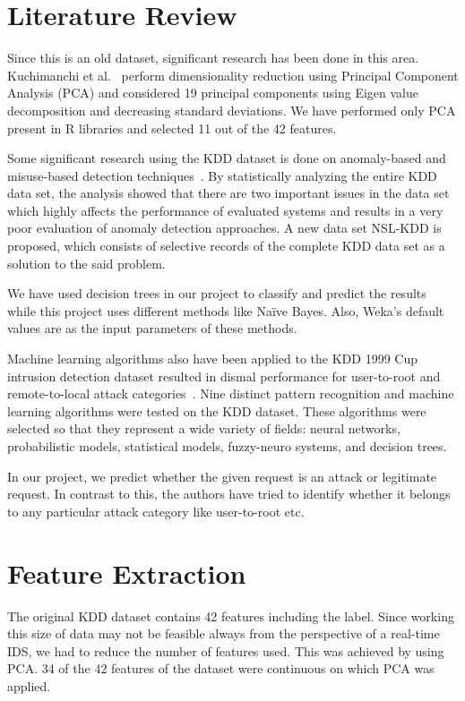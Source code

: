 \documentclass[11pt]{article}
\begin{document}
\section{Literature Review}
\label{Sec:Lit}
Since this is an old dataset, significant research has been done in this area. Kuchimanchi et al.~\cite{DimRed} perform dimensionality reduction using Principal Component Analysis (PCA) and considered 19 principal components using Eigen value decomposition and decreasing standard deviations. We have performed only PCA present in R libraries and selected 11 out of the 42 features.

Some significant research using the KDD dataset is done on anomaly-based and misuse-based detection techniques~\cite{detkdd}. By statistically analyzing the entire KDD data set, the analysis showed that there are two important issues in the data set which highly affects the performance of evaluated systems and results in a very
poor evaluation of anomaly detection approaches. A new data set NSL-KDD is proposed, which consists of selective records of the complete KDD data set as a solution to the said problem.

We have used decision trees in our project to classify and predict the results while this project uses different methods like Na{\"i}ve Bayes. Also, Weka's default values are as the input parameters of these methods.

Machine learning algorithms also have been applied to the KDD 1999 Cup intrusion detection dataset resulted in dismal performance for user-to-root and remote-to-local attack categories~\cite{sabhnani2003application}. Nine distinct pattern recognition and machine learning algorithms were tested on the KDD dataset. These algorithms were selected so that they represent a wide variety of fields: neural networks, probabilistic models, statistical models, fuzzy-neuro systems, and decision trees.

In our project, we predict whether the given request is an attack or legitimate request. In contrast to this, the authors have tried to identify whether it belongs to any particular attack category like user-to-root etc.


\section{Feature Extraction}
\label{Sec:Feature}
The original KDD dataset contains 42 features including the label. Since working this size of data may not be feasible always from the perspective of a real-time IDS, we had to reduce the number of features used. This was achieved by using PCA. 34 of the 42 features of the dataset were continuous on which PCA was applied.
\end{document}
